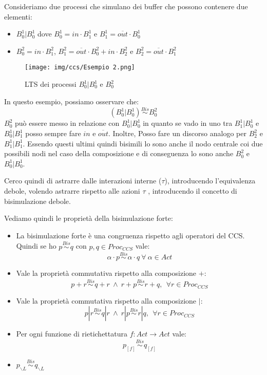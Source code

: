 \begin{esempio}
    Consideriamo due processi che simulano dei buffer che possono contenere due elementi:
    \begin{itemize}
        \item $B_0^1 | B_0^1$ dove $B_0^1 = in \cdot B_1^1$ e $B_1^1 = \overline{out} \cdot B_0^1$
        \item $B_0^2 = in \cdot B_1^2$, $B_1^2= \overline{out} \cdot B_0^2 + in \cdot B_2^2$ e $B_2^2 = \overline{out} \cdot B_1^2$
    \end{itemize}

    \begin{figure}[!ht]
        \centering
        \texttt{[image: img/ccs/Esempio 2.png]}
        \caption{LTS dei processi $B_0^1 | B_0^1$ e $B_0^2$}
    \end{figure}

    In questo esempio, possiamo osservare che: $$(B_0^1 | B_0^1) \stackrel{Bis}{\sim} B_0^2$$ $B_0^2$ può essere messo in relazione con $B_0^1| B_0^1$ in quanto se vado in uno tra $B_1^1 | B_0^1$ e $B_0^1 | B_1^1$ posso sempre fare $in$ e $\overline{out}$. Inoltre, Posso fare un discorso analogo per $B_2^2$ e $B_1^1 | B_1^1$. Essendo questi ultimi quindi bisimili lo sono anche il nodo centrale coi due possibili nodi nel caso della composizione e di conseguenza lo sono anche $B_0^2$ e $B_0^1 | B_0^1$.
\end{esempio}

Cerco quindi di astrarre dalle interazioni interne ($\tau$), introducendo l'equivalenza debole, volendo astrarre rispetto alle azioni $\tau$ , introducendo il concetto di bisimulazione debole.

Vediamo quindi le proprietà della bisimulazione forte:
\begin{itemize}
    \item La bisimulazione forte è una congruenza rispetto agli operatori del CCS. Quindi se ho $p \stackrel{Bis}{\sim} q$ con $p, q \in Proc_{CCS}$ vale: $$\alpha \cdot p \stackrel{Bis}{\sim}  \alpha \cdot q \ \forall \ \alpha \in Act$$
    \item Vale la proprietà commutativa rispetto alla composizione $+$: $$p + r \stackrel{Bis}{\sim} q + r \ \land \ r + p \stackrel{Bis}{\sim} r + q, \ \ \forall r \in Proc_{CCS}$$
    \item Vale la proprietà commutativa rispetto alla composizione $|$: $$p | r \stackrel{Bis}{\sim} q | r \ \land \ r | p \stackrel{Bis}{\sim} r | q, \ \ \forall r \in Proc_{CCS}$$
    \item Per ogni funzione di rietichettatura $f : Act \to Act$ vale: $$p_{[f]} \stackrel{Bis}{\sim} q_{[f]}$$
    \item $p_{\backslash L} \stackrel{Bis}{\sim} q_{\backslash L}$
\end{itemize}


